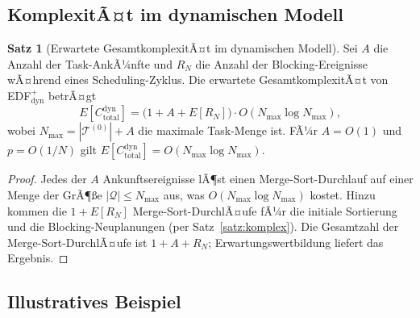 ﻿\documentclass[a4paper,12pt]{article}
\theoremstyle{definition}
\newtheorem{satz}{Satz}
\begin{document}
	\subsection{KomplexitÃ¤t im dynamischen Modell}

	\begin{satz}[Erwartete GesamtkomplexitÃ¤t im dynamischen Modell]
		\label{satz:komplex_dyn}
		Sei $A$ die Anzahl der Task-AnkÃ¼nfte und $R_N$ die Anzahl der Blocking-Ereignisse
		wÃ¤hrend eines Scheduling-Zyklus. Die erwartete GesamtkomplexitÃ¤t von
		EDF$^+_{\mathrm{dyn}}$ betrÃ¤gt
		\[
		E[C_{\mathrm{total}}^{\mathrm{dyn}}] = \bigl(1 + A + E[R_N]\bigr) \cdot O(N_{\max}\log N_{\max}),
		\]
		wobei $N_{\max} = |\mathcal{T}^{(0)}| + A$ die maximale Task-Menge ist.
		FÃ¼r $A = O(1)$ und $p = O(1/N)$ gilt
		$E[C_{\mathrm{total}}^{\mathrm{dyn}}] = O(N_{\max}\log N_{\max})$.
	\end{satz}

	\begin{proof}
		Jedes der $A$ Ankunftsereignisse lÃ¶st einen Merge-Sort-Durchlauf auf einer
		Menge der GrÃ¶\ss{}e $|\mathcal{Q}| \le N_{\max}$ aus, was $O(N_{\max}\log N_{\max})$
		kostet. Hinzu kommen die $1 + E[R_N]$ Merge-Sort-DurchlÃ¤ufe fÃ¼r die initiale
		Sortierung und die Blocking-Neuplanungen (per Satz~\ref{satz:komplex}). Die
		Gesamtzahl der Merge-Sort-DurchlÃ¤ufe ist $1 + A + R_N$; Erwartungswertbildung
		liefert das Ergebnis.
	\end{proof}

	\subsection{Illustratives Beispiel}
\end{document}
